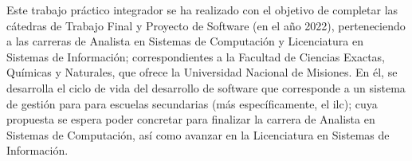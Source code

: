 \LARGE{ \indent
Este trabajo práctico integrador se ha realizado
con el objetivo de completar las cátedras de
Trabajo Final y Proyecto de Software (en el año 2022),
perteneciendo a las carreras de Analista en Sistemas
de Computación y Licenciatura en Sistemas de Información;
correspondientes a la Facultad de Ciencias Exactas,
Químicas y Naturales, que ofrece la Universidad Nacional
de Misiones.
}
\newline
\LARGE{ \indent
En él, se desarrolla el ciclo de vida del desarrollo de
software que corresponde a un sistema de gestión para
para escuelas secundarias (más específicamente, el
\acrlong{ilc}); cuya propuesta se espera poder concretar
para finalizar la carrera de Analista en Sistemas de
Computación, así como avanzar en la Licenciatura en
Sistemas de Información.
}
